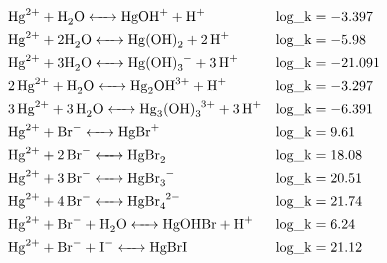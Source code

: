 \documentclass[12pt, a4paper]{article}
\begin{document}
\begin{align}
& \ce{Hg^2+ + H2O   <->  HgOH+ + H+} &&\mathrm{log\_k} = -3.397 \\
& \ce{Hg^2+ + 2 H2O <->  Hg(OH)2 + 2H+}  &&\mathrm{log\_k} = -5.98 \\
& \ce{Hg^2+ + 3 H2O  <->  Hg(OH)3^- + 3H+} &&\mathrm{log\_k} = -21.091 \\
& \ce{2Hg^2+ + H2O  <->  Hg_2OH^3+ + H+} && \mathrm{log\_k} = -3.297 \\
& \ce{3Hg^2+ + 3H2O  <->  Hg_3(OH)_3^3+ + 3H+} && \mathrm{log\_k} = -6.391 \\
& \ce{Hg^2+ + Br^- <-> HgBr^+} && \mathrm{log\_k} = 9.61 \\
& \ce{Hg^2+ + 2Br^- <-> HgBr2} && \mathrm{log\_k} = 18.08 \\
& \ce{Hg^2+ + 3Br^- <-> HgBr_3^-} && \mathrm{log\_k} = 20.51 \\
& \ce{Hg^2+ + 4Br^- <-> HgBr_4^2-} && \mathrm{log\_k} = 21.74 \\
& \ce{Hg^2+ + Br^- + H2O <-> HgOHBr + H+} && \mathrm{log\_k} = 6.24 \\
& \ce{Hg^2+ + Br^- + I- <-> HgBrI} && \mathrm{log\_k} = 21.12 \\

\end{align}
\end{document}
